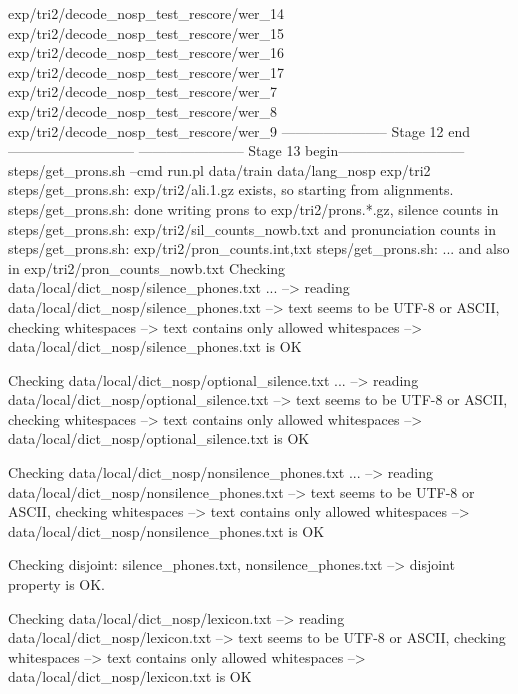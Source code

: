exp/tri2/decode_nosp_test_rescore/wer_14
exp/tri2/decode_nosp_test_rescore/wer_15
exp/tri2/decode_nosp_test_rescore/wer_16
exp/tri2/decode_nosp_test_rescore/wer_17
exp/tri2/decode_nosp_test_rescore/wer_7
exp/tri2/decode_nosp_test_rescore/wer_8
exp/tri2/decode_nosp_test_rescore/wer_9
----------------------- Stage 12 end---------------------------
----------------------- Stage 13 begin---------------------------
steps/get_prons.sh --cmd run.pl data/train data/lang_nosp exp/tri2
steps/get_prons.sh: exp/tri2/ali.1.gz exists, so starting from alignments.
steps/get_prons.sh: done writing prons to exp/tri2/prons.*.gz, silence counts in 
steps/get_prons.sh: exp/tri2/sil_counts_nowb.txt and pronunciation counts in 
steps/get_prons.sh: exp/tri2/pron_counts.{int,txt}
steps/get_prons.sh: ... and also in exp/tri2/pron_counts_nowb.txt
Checking data/local/dict_nosp/silence_phones.txt ...
--> reading data/local/dict_nosp/silence_phones.txt
--> text seems to be UTF-8 or ASCII, checking whitespaces
--> text contains only allowed whitespaces
--> data/local/dict_nosp/silence_phones.txt is OK

Checking data/local/dict_nosp/optional_silence.txt ...
--> reading data/local/dict_nosp/optional_silence.txt
--> text seems to be UTF-8 or ASCII, checking whitespaces
--> text contains only allowed whitespaces
--> data/local/dict_nosp/optional_silence.txt is OK

Checking data/local/dict_nosp/nonsilence_phones.txt ...
--> reading data/local/dict_nosp/nonsilence_phones.txt
--> text seems to be UTF-8 or ASCII, checking whitespaces
--> text contains only allowed whitespaces
--> data/local/dict_nosp/nonsilence_phones.txt is OK

Checking disjoint: silence_phones.txt, nonsilence_phones.txt
--> disjoint property is OK.

Checking data/local/dict_nosp/lexicon.txt
--> reading data/local/dict_nosp/lexicon.txt
--> text seems to be UTF-8 or ASCII, checking whitespaces
--> text contains only allowed whitespaces
--> data/local/dict_nosp/lexicon.txt is OK

